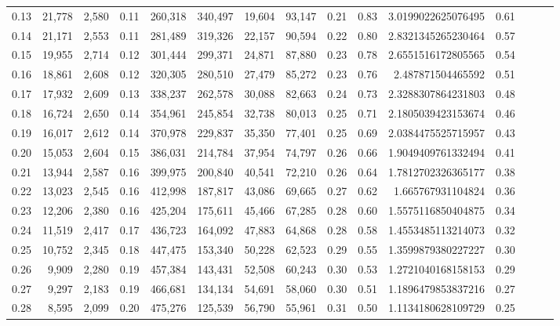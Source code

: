 \begin{tabular}{rrrrrrrrrrrrrrr}
0.13 &  21,778 &  2,580 &  0.11 &  260,318 &  340,497 &   19,604 &   93,147 &  0.21 &  0.83 &    3.0199022625076495 &      0.61 \\
0.14 &  21,171 &  2,553 &  0.11 &  281,489 &  319,326 &   22,157 &   90,594 &  0.22 &  0.80 &    2.8321345265230464 &      0.57 \\
0.15 &  19,955 &  2,714 &  0.12 &  301,444 &  299,371 &   24,871 &   87,880 &  0.23 &  0.78 &    2.6551516172805565 &      0.54 \\
0.16 &  18,861 &  2,608 &  0.12 &  320,305 &  280,510 &   27,479 &   85,272 &  0.23 &  0.76 &     2.487871504465592 &      0.51 \\
0.17 &  17,932 &  2,609 &  0.13 &  338,237 &  262,578 &   30,088 &   82,663 &  0.24 &  0.73 &    2.3288307864231803 &      0.48 \\
0.18 &  16,724 &  2,650 &  0.14 &  354,961 &  245,854 &   32,738 &   80,013 &  0.25 &  0.71 &    2.1805039423153674 &      0.46 \\
0.19 &  16,017 &  2,612 &  0.14 &  370,978 &  229,837 &   35,350 &   77,401 &  0.25 &  0.69 &    2.0384475525715957 &      0.43 \\
0.20 &  15,053 &  2,604 &  0.15 &  386,031 &  214,784 &   37,954 &   74,797 &  0.26 &  0.66 &    1.9049409761332494 &      0.41 \\
0.21 &  13,944 &  2,587 &  0.16 &  399,975 &  200,840 &   40,541 &   72,210 &  0.26 &  0.64 &    1.7812702326365177 &      0.38 \\
0.22 &  13,023 &  2,545 &  0.16 &  412,998 &  187,817 &   43,086 &   69,665 &  0.27 &  0.62 &     1.665767931104824 &      0.36 \\
0.23 &  12,206 &  2,380 &  0.16 &  425,204 &  175,611 &   45,466 &   67,285 &  0.28 &  0.60 &    1.5575116850404875 &      0.34 \\
0.24 &  11,519 &  2,417 &  0.17 &  436,723 &  164,092 &   47,883 &   64,868 &  0.28 &  0.58 &    1.4553485113214073 &      0.32 \\
0.25 &  10,752 &  2,345 &  0.18 &  447,475 &  153,340 &   50,228 &   62,523 &  0.29 &  0.55 &    1.3599879380227227 &      0.30 \\
0.26 &   9,909 &  2,280 &  0.19 &  457,384 &  143,431 &   52,508 &   60,243 &  0.30 &  0.53 &    1.2721040168158153 &      0.29 \\
0.27 &   9,297 &  2,183 &  0.19 &  466,681 &  134,134 &   54,691 &   58,060 &  0.30 &  0.51 &    1.1896479853837216 &      0.27 \\
0.28 &   8,595 &  2,099 &  0.20 &  475,276 &  125,539 &   56,790 &   55,961 &  0.31 &  0.50 &    1.1134180628109729 &      0.25 \\

\end{tabular}

